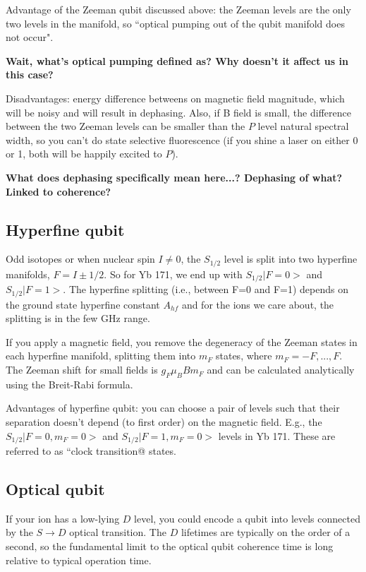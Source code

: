\documentclass{article}
\begin{document}
Advantage of the Zeeman qubit discussed above: the Zeeman levels are the only two levels in the manifold, so ``optical pumping out of the qubit manifold does not occur". 

\textbf{Wait, what's optical pumping defined as? Why doesn't it affect us in this case?}

Disadvantages: energy difference betweens on magnetic field magnitude, which will be noisy and will result in dephasing. Also, if B field is small, the difference between the two Zeeman levels can be smaller than the $P$ level natural spectral width, so you can't do state selective fluorescence (if you shine a laser on either 0 or 1, both will be happily excited to $P$).

\textbf{What does dephasing specifically mean here...? Dephasing of what? Linked to coherence?}


\subsection{Hyperfine qubit}

Odd isotopes or when nuclear spin $I \neq 0$, the $S_{1/2}$ level is split into two hyperfine manifolds, $F = I \pm 1/2$. So for Yb 171, we end up with $S_{1/2}|F=0>$ and $S_{1/2}|F=1>$.  The hyperfine splitting (i.e., between F=0 and F=1) depends on the ground state hyperfine constant $A_{hf}$ and for the ions we care about, the splitting is in the few GHz range. 

If you apply a magnetic field, you remove the degeneracy of the Zeeman states in each hyperfine manifold, splitting them into $m_F$ states, where $m_F = -F, ..., F$. The Zeeman shift for small fields is $g_F \mu_B B m_F$ and can be calculated analytically using the Breit-Rabi formula.

Advantages of hyperfine qubit: you can choose a pair of levels such that their separation doesn't depend (to first order) on the magnetic field. E.g., the $S_{1/2}|F=0, m_F=0>$ and $S_{1/2}|F=1, m_F=0>$ levels in Yb 171. These are referred to as ``clock transition@ states.


\subsection{Optical qubit}

If your ion has a low-lying $D$ level, you could encode a qubit into levels connected by the $S \rightarrow D$ optical transition. The $D$ lifetimes are typically on the order of a second, so the fundamental limit to the optical qubit coherence time is long relative to typical operation time.
\end{document}
